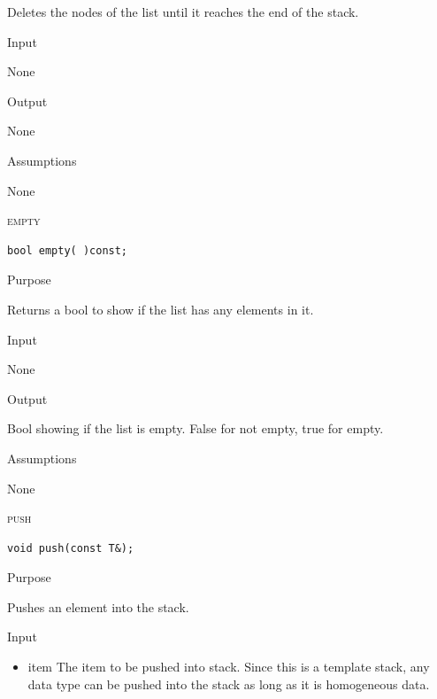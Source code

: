\documentclass[pdftex, 11pt]{article}
\begin{document}
\begin{description}
\begin{description}
				Deletes the nodes of the list until it reaches
				the end of the stack.

			\item{Input}

				None

			\item{Output}
				
				None

			\item{Assumptions}

				None

		\end{description}
	\item{\textsc{empty}}

		\begin{lstlisting}
bool empty( )const;
		\end{lstlisting}

		\begin{description}
			\item{Purpose}
				
				Returns a bool to show if the list has any
				elements in it.

			\item{Input}

				None

			\item{Output}
				
				Bool showing if the list is empty. False for not
				empty, true for empty.

			\item{Assumptions}

				None

		\end{description}
	\item{\textsc{push}}

		\begin{lstlisting}
void push(const T&);
		\end{lstlisting}

		\begin{description}
			\item{Purpose}
				
				Pushes an element into the stack.

			\item{Input}

				\begin{itemize}
					\item{item}
						The item to be pushed into
						stack. Since this is a template
						stack, any data type can be
						pushed into the stack as long as
						it is homogeneous data.
				\end{itemize}


\end{description}
\end{description}
\end{document}
